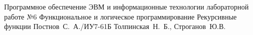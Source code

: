 \documentclass{bmstu}
\begin{document}
	
	{Программное обеспечение ЭВМ и информационные технологии}
	{лабораторной работе №6}
	{Функциональное и логическое программирование}
	{Рекурсивные функции}
	{}
	{Постнов~С.~А./ИУ7-61Б}
	{Толпинская~Н.~Б., Строганов~Ю.В.}
	
	
	
\end{document}
